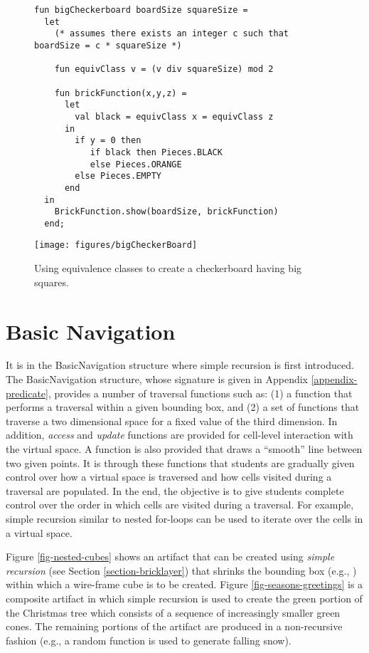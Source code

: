 \documentclass[submission,copyright,creativecommons]{eptcs}
\begin{document}
\begin{figure*}[htb!]
\begin{lstlisting}
fun bigCheckerboard boardSize squareSize =
  let
    (* assumes there exists an integer c such that boardSize = c * squareSize *)

    fun equivClass v = (v div squareSize) mod 2

    fun brickFunction(x,y,z) =
      let
        val black = equivClass x = equivClass z
      in
        if y = 0 then
           if black then Pieces.BLACK
           else Pieces.ORANGE
        else Pieces.EMPTY
      end
  in
    BrickFunction.show(boardSize, brickFunction)
  end;
\end{lstlisting}


\begin{center}
\texttt{[image: figures/bigCheckerBoard]}
\end{center}

\caption{Using equivalence classes to create a checkerboard having big squares.}\label{fig-bigCheckerboard}
\end{figure*}


\section{Basic Navigation}\label{section-basic-navigation}
It is in the BasicNavigation structure where simple recursion is first introduced. The BasicNavigation structure, whose signature is given in Appendix \ref{appendix-predicate}, provides a number of traversal functions such as: (1) a function that performs a traversal within a given bounding box, and (2) a set of functions that traverse a two dimensional space for a fixed value of the third dimension. In addition, \emph{access} and \emph{update} functions are provided for cell-level interaction with the virtual space. A function is also provided that draws a ``smooth'' line between two given points. It is through these functions that students are gradually given control over how a virtual space is traversed and how cells visited during a traversal are populated. In the end, the objective is to give students complete control over the order in which cells are visited during a traversal. For example, simple recursion similar to nested for-loops can be used to iterate over the cells in a virtual space.

Figure \ref{fig-nested-cubes} shows an artifact that can be created using \emph{simple recursion} (see Section \ref{section-bricklayer}) that shrinks the bounding box (e.g.,   ) within which a wire-frame cube is to be created. Figure \ref{fig-seasons-greetings} is a composite artifact in which simple recursion is used to create the green portion of the Christmas tree which consists of a sequence of increasingly smaller green cones. The remaining portions of the artifact are produced in a non-recursive fashion (e.g., a random function is used to generate falling snow).
\end{document}
